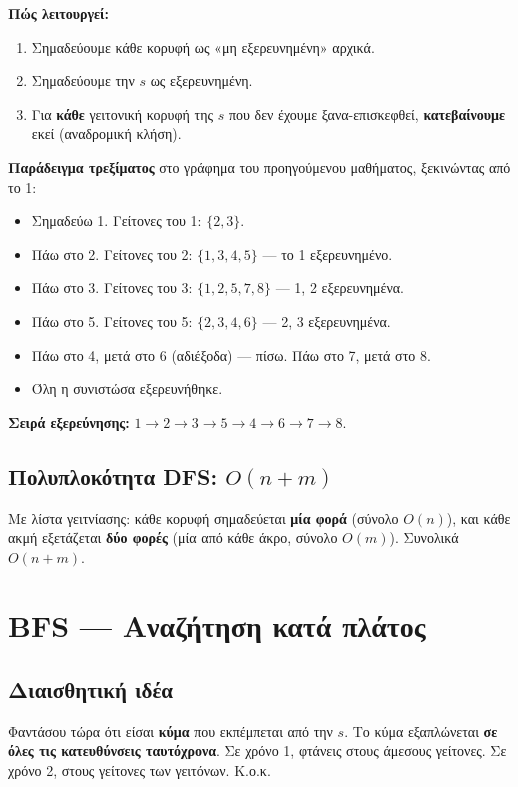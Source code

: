 \documentclass[11pt,a4paper]{article}
\begin{document}
\textbf{Πώς λειτουργεί:}
\begin{enumerate}
  \item Σημαδεύουμε κάθε κορυφή ως «μη εξερευνημένη» αρχικά.
  \item Σημαδεύουμε την $s$ ως εξερευνημένη.
  \item Για \textbf{κάθε} γειτονική κορυφή της $s$ που δεν έχουμε
  ξανα-επισκεφθεί, \textbf{κατεβαίνουμε} εκεί (αναδρομική κλήση).
\end{enumerate}

\textbf{Παράδειγμα τρεξίματος} στο γράφημα του προηγούμενου μαθήματος, ξεκινώντας
από το 1:
\begin{itemize}
  \item Σημαδεύω 1. Γείτονες του 1: $\{2, 3\}$.
  \item Πάω στο 2. Γείτονες του 2: $\{1, 3, 4, 5\}$ --- το 1 εξερευνημένο.
  \item Πάω στο 3. Γείτονες του 3: $\{1, 2, 5, 7, 8\}$ --- 1, 2 εξερευνημένα.
  \item Πάω στο 5. Γείτονες του 5: $\{2, 3, 4, 6\}$ --- 2, 3 εξερευνημένα.
  \item Πάω στο 4, μετά στο 6 (αδιέξοδα) --- πίσω. Πάω στο 7, μετά στο 8.
  \item Όλη η συνιστώσα εξερευνήθηκε.
\end{itemize}
\textbf{Σειρά εξερεύνησης:} $1 \to 2 \to 3 \to 5 \to 4 \to 6 \to 7 \to 8$.

\subsection{Πολυπλοκότητα DFS: $O(n + m)$}

Με λίστα γειτνίασης: κάθε κορυφή σημαδεύεται \textbf{μία φορά} (σύνολο $O(n)$),
και κάθε ακμή εξετάζεται \textbf{δύο φορές} (μία από κάθε άκρο, σύνολο $O(m)$).
Συνολικά $O(n + m)$.

\section{BFS --- Αναζήτηση κατά πλάτος}

\subsection{Διαισθητική ιδέα}

Φαντάσου τώρα ότι είσαι \textbf{κύμα} που εκπέμπεται από την $s$. Το κύμα
εξαπλώνεται \textbf{σε όλες τις κατευθύνσεις ταυτόχρονα}. Σε χρόνο 1, φτάνεις
στους άμεσους γείτονες. Σε χρόνο 2, στους γείτονες των γειτόνων. Κ.ο.κ.
\end{document}
